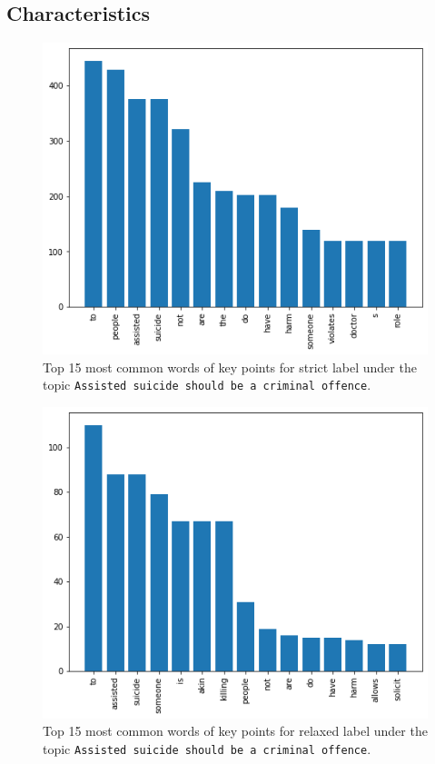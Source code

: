 \subsection{Characteristics}
\begin{figure}
	\caption{Top 15 most common words of key points for strict label under the topic \texttt{Assisted suicide should be a criminal offence}.}
	\label{fig:stopwords-strict}
	\includegraphics[width=\linewidth]{figures/data_stopwords1.png}
\end{figure}
\begin{figure}
	\caption{Top 15 most common words of key points for relaxed label under the topic \texttt{Assisted suicide should be a criminal offence}.}
	\label{fig:stopwords-relaxed}
	\includegraphics[width=\linewidth]{figures/data_stopwords2.png}
\end{figure}

